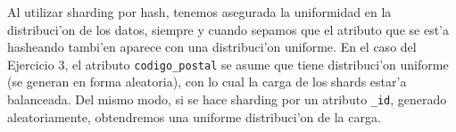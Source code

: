 Al utilizar sharding por hash, tenemos asegurada la uniformidad en la distribuci'on de los datos, siempre y cuando sepamos que el atributo que se est'a hasheando tambi'en aparece con una distribuci'on uniforme. En el caso del Ejercicio 3, el atributo \texttt{codigo\_postal} se asume que tiene distribuci'on uniforme (se generan en forma aleatoria), con lo cual la carga de los shards estar'a balanceada. Del mismo modo, si se hace sharding por un atributo \texttt{\_id}, generado aleatoriamente, obtendremos una uniforme distribuci'on de la carga.